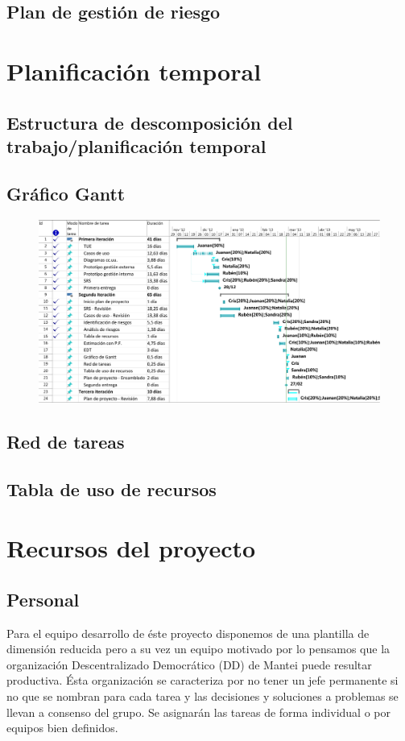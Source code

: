 \documentclass[11pt, a4paper, twoside]{report}
\begin{document}
		\subsection{Plan de gestión de riesgo}
	\section{Planificación temporal}		
		\subsection{Estructura de descomposición del trabajo/planificación temporal}
			 

		\begin{landscape}
		\subsection{Gráfico Gantt}
			\begin{figure}[h] \centering
			\vspace{1.1cm}
			\includegraphics[scale=.8]{planific/Gantt}
			\end{figure}
		\end{landscape}

		\subsection{Red de tareas}
		\subsection{Tabla de uso de recursos}
	\section{Recursos del proyecto}
		\subsection{Personal}
		Para el equipo desarrollo de éste proyecto disponemos de una plantilla de dimensión reducida pero a su vez un equipo motivado por lo pensamos que la organización Descentralizado Democrático (DD) de Mantei puede resultar productiva. Ésta organización se caracteriza por no tener un jefe permanente si no que se nombran para cada tarea y las decisiones y soluciones a problemas se llevan a consenso del grupo. Se asignarán las tareas de forma individual o por equipos bien definidos.
\end{document}
